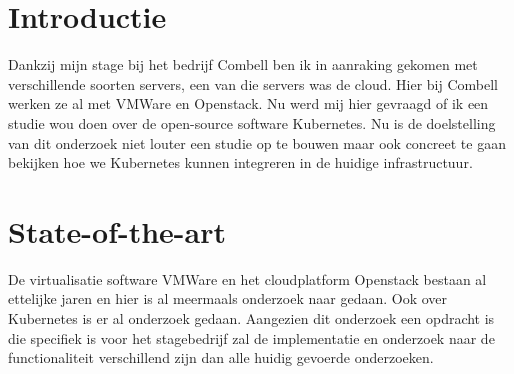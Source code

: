 \documentclass[fleqn,10pt]{voorstel}
\affiliation{\textbf{Contact:}
  \textsuperscript{1} \href{mailto:pieterjan.philips@gmail.com}{pieterjan.philips@gmail.com}}
\begin{document}
\flushbottom %
\maketitle %
\tableofcontents %
\thispagestyle{empty} %



\section{Introductie} %
\label{sec:introductie}

Dankzij mijn stage bij het bedrijf Combell ben ik in aanraking gekomen met verschillende soorten servers, een van die servers was de cloud. Hier bij Combell werken ze al met VMWare en Openstack. Nu werd mij hier gevraagd of ik een studie wou doen over de open-source software Kubernetes. Nu is de doelstelling van dit onderzoek niet louter een studie op te bouwen maar ook concreet te gaan bekijken hoe we Kubernetes kunnen integreren in de huidige infrastructuur.


\section{State-of-the-art}
\label{sec:state-of-the-art}

De virtualisatie software VMWare en het cloudplatform Openstack bestaan al ettelijke jaren en hier is al meermaals onderzoek naar gedaan. Ook over Kubernetes is er al onderzoek gedaan. Aangezien dit onderzoek een opdracht is die specifiek is voor het stagebedrijf zal de implementatie en onderzoek naar de functionaliteit verschillend zijn dan alle huidig gevoerde onderzoeken.

\end{document}
